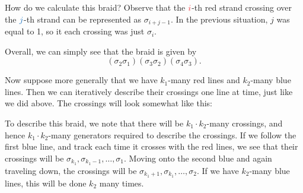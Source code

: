 How do we calculate this braid? Observe that the $\textcolor{Red}{i}$-th red strand 
crossing over the $\textcolor{RoyalBlue}{j}$-th strand can be represented 
as $\sigma_{i + j - 1}$. In the previous situation, $j$ was equal to 1, so it 
each crossing was just $\sigma_{i}$.

\begin{center}
    \hspace{1cm}
    \raisebox{2cm}{$\mapsto$}
    \hspace{1cm}
\end{center}
Overall, we can simply see that the braid is given by 
\[
    (\sigma_2\sigma_1)(\sigma_3\sigma_2)(\sigma_4\sigma_3).  
\]

Now suppose more generally that we have $k_1$-many red lines and $k_2$-many blue lines.
Then we can iteratively describe their 
crossings one line at time, just like we did above. 
The crossings will look somewhat like this:

\newpage
To describe this braid, we note that there will be $k_1\cdot k_2$-many crossings, 
and hence $k_1\cdot k_2$-many generators required to describe 
the crossings. If we follow the first blue line, and track 
each time it crosses with the red lines, we see that their 
crossings will be $\sigma_{k_1}, \sigma_{k_1-1}, \dots, 
\sigma_{1}$. Moving onto the second blue and again traveling down, the crossings 
will be $\sigma_{k_1+1}, \sigma_{k_1}, \dots, 
\sigma_{2}$. If we have $k_2$-many blue lines, this will be done $k_2$ many times.

